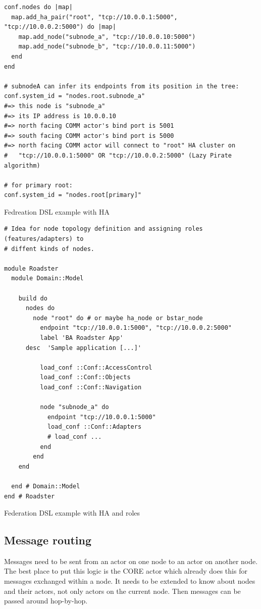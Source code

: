\begin{listing}
	\begin{verbatim}
conf.nodes do |map|
  map.add_ha_pair("root", "tcp://10.0.0.1:5000", "tcp://10.0.0.2:5000") do |map|
    map.add_node("subnode_a", "tcp://10.0.0.10:5000")
    map.add_node("subnode_b", "tcp://10.0.0.11:5000")
  end
end

# subnodeA can infer its endpoints from its position in the tree:
conf.system_id = "nodes.root.subnode_a"
#=> this node is "subnode_a"
#=> its IP address is 10.0.0.10
#=> north facing COMM actor's bind port is 5001
#=> south facing COMM actor's bind port is 5000
#=> north facing COMM actor will connect to "root" HA cluster on
#   "tcp://10.0.0.1:5000" OR "tcp://10.0.0.2:5000" (Lazy Pirate algorithm)

# for primary root:
conf.system_id = "nodes.root[primary]"
	\end{verbatim}
	\caption{Fedreation DSL example with HA}
	\label{lst:dsl:topo:with-ha}
\end{listing}

\begin{listing}
	\begin{verbatim}
# Idea for node topology definition and assigning roles (features/adapters) to
# diffent kinds of nodes.

module Roadster
  module Domain::Model

    build do
      nodes do
        node "root" do # or maybe ha_node or bstar_node
          endpoint "tcp://10.0.0.1:5000", "tcp://10.0.0.2:5000"
          label 'BA Roadster App'
	  desc  'Sample application [...]'

          load_conf ::Conf::AccessControl
          load_conf ::Conf::Objects
          load_conf ::Conf::Navigation

          node "subnode_a" do
            endpoint "tcp://10.0.0.1:5000"
            load_conf ::Conf::Adapters
            # load_conf ...
          end
        end
    end

  end # Domain::Model
end # Roadster
	\end{verbatim}
	\caption{Federation DSL example with HA and roles}
	\label{lst:dsl:topo:with-roles}
\end{listing}

\subsection{Message routing}
Messages need to be sent from an actor on one node to an actor on another node.
The best place to put this logic is the CORE actor which already does this for
messages exchanged within a node. It needs to be extended to know about nodes
and their actors, not only actors on the current node. Then messages can be
passed around hop-by-hop.

